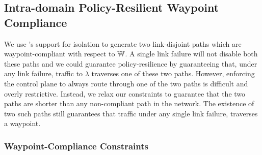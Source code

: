 %









\subsection{Intra-domain Policy-Resilient Waypoint Compliance}\label{sec:ospfwaypoint}
We use \genesis's
support for isolation to generate two link-disjoint paths
which are waypoint-compliant with respect to $\mathbb{W}$. A single link
failure will not disable both these paths
and we could guarantee policy-resilience by 
guaranteeing that, under any link failure,
traffic to $\lambda$ 
traverses one of these two paths. However, enforcing the control plane to 
always route through one of the two paths is difficult and overly 
restrictive. 
Instead, we relax our constraints to guarantee that
the two paths are shorter than any non-compliant path in 
the network. The existence of two such paths still guarantees that 
traffic
under any single link failure,
 traverses a waypoint. 



\subsubsection{Waypoint-Compliance Constraints} \hspace*{4mm}


